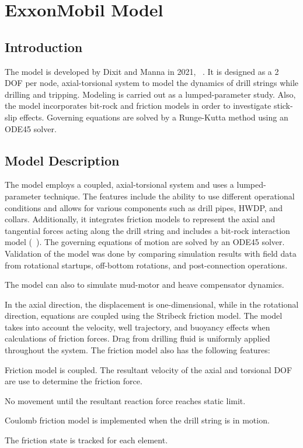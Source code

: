 \chapter{ExxonMobil Model}
\label{ch:exxonmobilmodel}

\section{Introduction}
The model is developed by Dixit and Manna in 2021, ~\cite{ref:dixit2021a}. It is designed as a 2 DOF per node, axial-torsional system to model the dynamics of drill strings while drilling and tripping. Modeling is carried out as a lumped-parameter study. Also, the model incorporates bit-rock and friction models in order to investigate stick-slip effects. Governing equations are solved by a Runge-Kutta method using an ODE45 solver. 

\section{Model Description}
The model employs a coupled, axial-torsional system and uses a lumped-parameter technique. The features include the ability to use different operational conditions and allows for various components such as drill pipes, HWDP, and collars. Additionally, it integrates friction models to represent the axial and tangential forces acting along the drill string and includes a bit-rock interaction model (~\cite{ref:cayeux2020a}). The governing equations of motion are solved by an ODE45 solver. Validation of the model was done by comparing simulation results with field data from rotational startups, off-bottom rotations, and post-connection operations. 

The model can also to simulate mud-motor and heave compensator dynamics.

In the axial direction, the displacement is one-dimensional, while in the rotational direction, equations are coupled using the Stribeck friction model. The model takes into account the velocity, well trajectory, and buoyancy effects when calculations of friction forces. Drag from drilling fluid is uniformly applied throughout the system. The friction model also has the following features:
\begin{bulletedlist}
    \item Friction model is coupled.  The resultant velocity of the axial and torsional DOF are use to determine the friction force.
    \item No movement until the resultant reaction force reaches static limit.
    \item Coulomb friction model is implemented when the drill string is in motion.
    \item The friction state is tracked for each element.
\end{bulletedlist}

